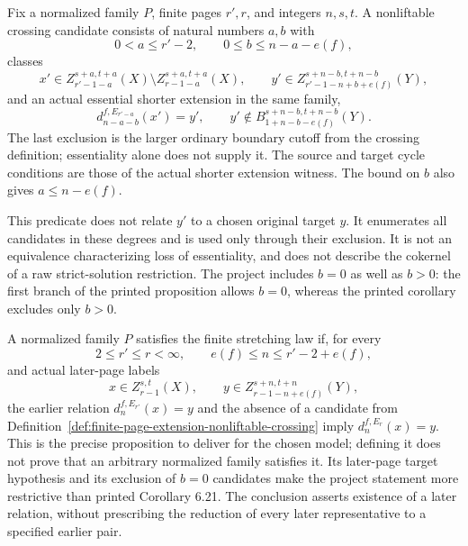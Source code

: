 \begin{definition}
  \label{def:finite-page-extension-nonliftable-crossing}
  \leanok
  Fix a normalized family $P$, finite pages $r',r$, and integers $n,s,t$.
  A nonliftable crossing candidate consists of natural numbers $a,b$ with
  \[
    0<a\le r'-2,\qquad 0\le b\le n-a-e(f),
  \]
  classes
  \[
    x'\in Z_{r'-1-a}^{s+a,t+a}(X)
       \setminus Z_{r-1-a}^{s+a,t+a}(X),\qquad
    y'\in Z_{r'-1-n+b+e(f)}^{s+n-b,t+n-b}(Y),
  \]
  and an actual essential shorter extension in the same family,
  \[
    d_{n-a-b}^{f,E_{r'-a}}(x')=y',\qquad
    y'\notin B_{1+n-b-e(f)}^{s+n-b,t+n-b}(Y).
  \]
  The last exclusion is the larger ordinary boundary cutoff from the
  crossing definition; essentiality alone does not supply it.
  The source and target cycle conditions are those of the actual shorter
  extension witness.  The bound on $b$ also gives $a\le n-e(f)$.

  This predicate does not relate $y'$ to a chosen original target $y$.
  It enumerates all candidates in these degrees and is used only through
  their exclusion.  It is not an equivalence characterizing loss of
  essentiality, and does not describe the cokernel of a raw strict-solution
  restriction.  The project includes $b=0$ as well as $b>0$: the first
  branch of the printed proposition allows $b=0$, whereas the printed
  corollary excludes only $b>0$.
\end{definition}

\begin{definition}
  \label{def:finite-page-extension-stretching-law}
  \leanok
  A normalized family $P$ satisfies the finite stretching law if, for every
  \[
    2\le r'\le r<\infty,\qquad e(f)\le n\le r'-2+e(f),
  \]
  and actual later-page labels
  \[
    x\in Z_{r-1}^{s,t}(X),\qquad
    y\in Z_{r-1-n+e(f)}^{s+n,t+n}(Y),
  \]
  the earlier relation $d_n^{f,E_{r'}}(x)=y$ and the absence of a candidate
  from Definition~\ref{def:finite-page-extension-nonliftable-crossing}
  imply $d_n^{f,E_r}(x)=y$.
  This is the precise proposition to deliver for the chosen model; defining
  it does not prove that an arbitrary normalized family satisfies it.
  Its later-page target hypothesis and its exclusion of $b=0$ candidates
  make the project statement more restrictive than printed Corollary 6.21.
  The conclusion asserts existence of a later relation, without prescribing
  the reduction of every later representative to a specified earlier pair.
\end{definition}

